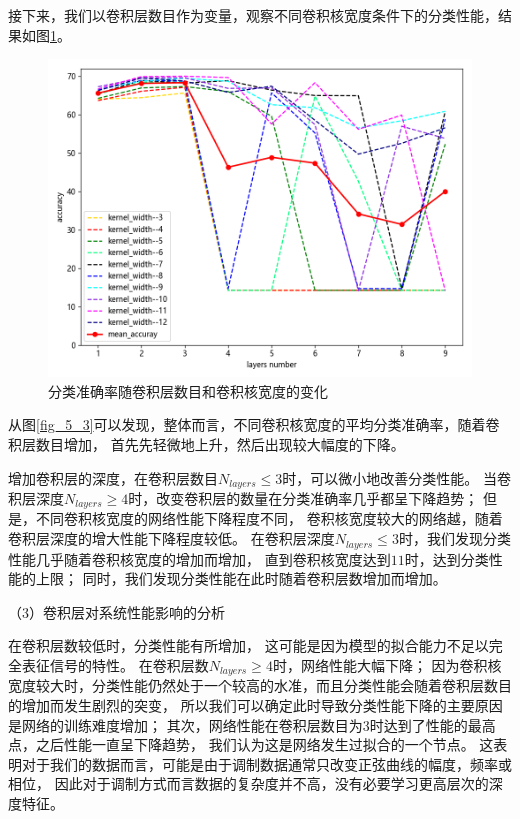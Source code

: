 接下来，我们以卷积层数目作为变量，观察不同卷积核宽度条件下的分类性能，结果如图\ref{fig_5_2}。
\begin{figure}[!h]
	\centering
	\includegraphics[scale=0.6]{figures/chapter_5/fig_5_4}
	\caption{分类准确率随卷积层数目和卷积核宽度的变化}
	\label{fig_5_2}
\end{figure}

从图\ref{fig_5_3}可以发现，整体而言，不同卷积核宽度的平均分类准确率，随着卷积层数目增加，
首先先轻微地上升，然后出现较大幅度的下降。\par

增加卷积层的深度，在卷积层数目$N_{layers} \leq 3$时，可以微小地改善分类性能。
当卷积层深度$N_{layers} \geq 4$时，改变卷积层的数量在分类准确率几乎都呈下降趋势；
但是，不同卷积核宽度的网络性能下降程度不同，
卷积核宽度较大的网络越，随着卷积层深度的增大性能下降程度较低。
在卷积层深度$N_{layers} \leq 3$时，我们发现分类性能几乎随着卷积核宽度的增加而增加，
直到卷积核宽度达到$11$时，达到分类性能的上限；
同时，我们发现分类性能在此时随着卷积层数增加而增加。\par

（3）卷积层对系统性能影响的分析\par

在卷积层数较低时，分类性能有所增加，
这可能是因为模型的拟合能力不足以完全表征信号的特性。
在卷积层数$N_{layers} \geq 4$时，网络性能大幅下降；
因为卷积核宽度较大时，分类性能仍然处于一个较高的水准，而且分类性能会随着卷积层数目的增加而发生剧烈的突变，
所以我们可以确定此时导致分类性能下降的主要原因是网络的训练难度增加；
其次，网络性能在卷积层数目为3时达到了性能的最高点，之后性能一直呈下降趋势，
我们认为这是网络发生过拟合的一个节点。
这表明对于我们的数据而言，可能是由于调制数据通常只改变正弦曲线的幅度，频率或相位，
因此对于调制方式而言数据的复杂度并不高，没有必要学习更高层次的深度特征。
\par

